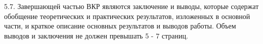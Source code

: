 5.7.	Завершающей частью ВКР являются заключение и выводы, которые
содержат обобщение теоретических и практических результатов, 
изложенных в основной части,
и краткое описание основных результатов и выводов работы.
   Объем выводов и заключения не должен превышать 5 - 7 страниц.

